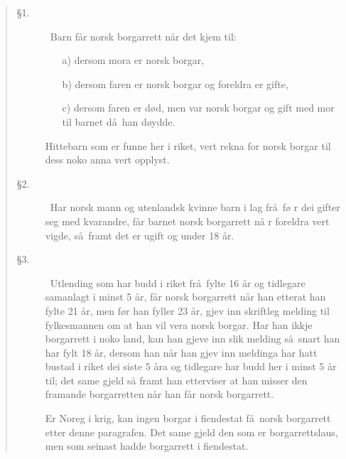 \begin{quote}
\begin{description}

\item[\S 1.]\ Barn f\aa r norsk borgarrett n\aa r det kjem til:
\begin{itemize}
\item[a)]{dersom mora er norsk borgar,}
\item[b)]{dersom faren er norsk borgar og foreldra er gifte,}
\item[c)]{dersom faren er d\o d, men var norsk borgar og gift med mor
  til barnet d\aa\ han d\o ydde.}
\end{itemize}
Hittebarn som er funne her i riket, vert rekna for norsk borgar til
dess noko anna vert opplyst.

\item[\S 2.]\ Har norsk mann og utenlandsk kvinne barn i lag fr\aa\ f\o
  r dei gifter seg med kvarandre, f\aa r barnet norsk borgarrett n\aa
  r foreldra vert vigde, s\aa\ framt det er ugift og under 18 \aa r.

\item[\S 3.]\ Utlending som har budd i riket fr\aa\ fylte 16 \aa r og
  tidlegare samanlagt i minst 5 \aa r, f\aa r norsk borgarrett n\aa r
  han etterat han fylte 21 \aa r, men f\o r han fyller 23 \aa r, gjev
  inn skriftleg melding til fylkesmannen om at han vil vera norsk
  borgar. Har han ikkje borgarrett i noko land, kan han gjeve inn slik
  melding s\aa\ snart han har fylt 18 \aa r, dersom han n\aa r han
  gjev inn meldinga har hatt bustad i riket dei siste 5 \aa ra og
  tidlegare har budd her i minst 5 \aa r til; det same gjeld s\aa
  framt han etterviser at han misser den framande borgarretten n\aa r
  han f\aa r norsk borgarrett.

  Er Noreg i krig, kan ingen borgar i fiendestat f\aa\ norsk
  borgarrett etter denne paragrafen. Det same gjeld den som er
  borgarrettslaus, men som seinast hadde borgarrett i fiendestat.

\end{description}
\end{quote}
